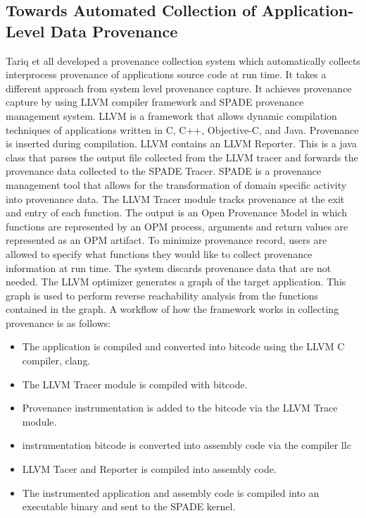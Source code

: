 \subsection{Towards Automated Collection of Application-Level Data Provenance}
Tariq et \cite{tariq_towards_2012} all developed a provenance collection system which automatically collects interprocess provenance of applications source code at run time. It takes a different approach from system level provenance capture. It achieves provenance capture by using LLVM compiler framework and SPADE provenance management system. LLVM is a framework that allows dynamic compilation techniques of applications written in C, C++, Objective-C, and Java. Provenance is inserted during compilation. LLVM contains an LLVM Reporter. This is a java class that parses the output file collected from the LLVM tracer and forwards the provenance data collected to the SPADE Tracer. SPADE is a provenance management tool that allows for the transformation of domain specific activity into provenance data. The LLVM Tracer module tracks provenance at the exit and entry of each function. The output is an Open Provenance Model in which functions are represented by an OPM process, arguments and return values are represented as an OPM artifact. To minimize provenance record, users are allowed to specify what functions they would like to collect provenance information at run time. The system discards provenance data that are not needed. The LLVM optimizer generates a graph of the target application. This graph is used to perform reverse reachability analysis  from the functions contained in the graph.  A workflow of how the framework works in collecting provenance is as follows:

\begin{itemize}
\item The application is compiled and converted into bitcode using the LLVM C compiler, clang.

\item The LLVM Tracer module is compiled with bitcode.

\item Provenance instrumentation is added to the bitcode via the LLVM Trace module.

\item instrumentation bitcode is converted into assembly code via the compiler llc

\item LLVM Tacer and Reporter is compiled into assembly code.

\item  The instrumented application and assembly code is compiled into an executable binary and sent to the SPADE kernel.
\end{itemize}

